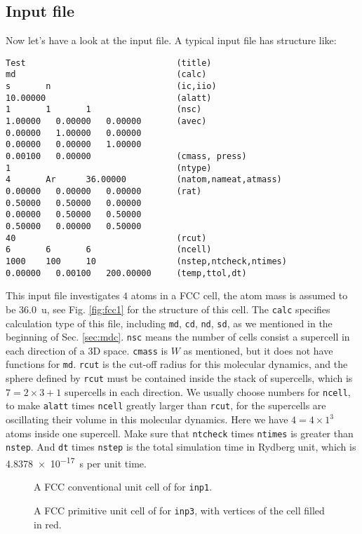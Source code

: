 
\subsection{Input file}

Now let's have a look at the input file.
A typical input file has structure like:
\begin{verbatim}
Test                              (title)
md                                (calc)
s       n                         (ic,iio)
10.00000                          (alatt)
1       1       1                 (nsc)
1.00000   0.00000   0.00000       (avec)
0.00000   1.00000   0.00000
0.00000   0.00000   1.00000
0.00100   0.00000                 (cmass, press)
1                                 (ntype)
4       Ar      36.00000          (natom,nameat,atmass)
0.00000   0.00000   0.00000       (rat)
0.50000   0.50000   0.00000
0.00000   0.50000   0.50000
0.50000   0.00000   0.50000
40                                (rcut)
6       6       6                 (ncell)
1000    100     10                (nstep,ntcheck,ntimes)
0.00000   0.00100   200.00000     (temp,ttol,dt)
\end{verbatim}

This input file investigates $4$  atoms in a FCC cell, the atom mass is assumed to be \SI{36.0}{\atomicmassunit},
see Fig. \ref{fig:fcc1} for the structure of this cell.
The \texttt{calc} specifies calculation type of this file, including \texttt{md},
\texttt{cd}, \texttt{nd}, \texttt{sd}, as we mentioned in the beginning of Sec. \ref{sec:mdc}.
\texttt{nsc} means the number of cells consist a supercell in each direction of a 3D space.
\texttt{cmass} is $W$ as mentioned, but it does not have functions for \texttt{md}.
\texttt{rcut} is the cut-off radius for this molecular dynamics, and the sphere defined by
\texttt{rcut} must be contained inside the stack of supercells, which is $7=2\times 3+1$ supercells in each direction. We usually choose numbers for \texttt{ncell}, to make
\texttt{alatt} times \texttt{ncell} greatly larger than \texttt{rcut}, for the supercells are
oscillating their volume in this molecular dynamics.
Here we have $4=4 \times 1^3$ atoms inside one supercell.
Make sure that \texttt{ntcheck} times \texttt{ntimes} is greater than
\texttt{nstep}.
And \texttt{dt} times \texttt{nstep} is the total simulation time in Rydberg unit, which is
\SI{4.8378e-17}{\second} per unit time.

\begin{figure}[H]
\begin{minipage}{0.48\textwidth}
	\centering
	
	\caption{A FCC conventional unit cell of  for \texttt{inp1}.}
	\label{fig:fcc1}
\end{minipage}
\hfill
\begin {minipage}{0.48\textwidth}
\centering

\caption{A FCC primitive unit cell of  for \texttt{inp3}, with
	vertices of the cell filled in red.}
\label{fig:fcc3}
\end{minipage}
\end{figure}

